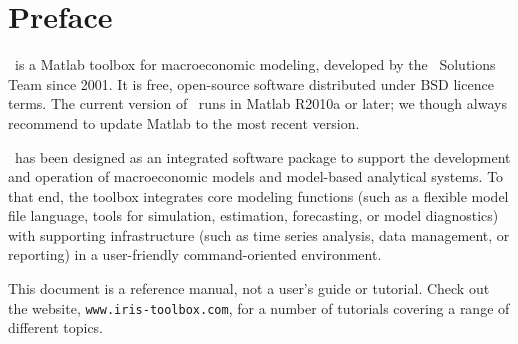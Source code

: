 
\section *{Preface}

\iris\ is a Matlab\raisebox{0.3em}{\tiny\textregistered} toolbox for macroeconomic modeling, developed by the \iris\ Solutions Team since 2001. It is free, open-source software distributed under BSD licence terms. The current version of \iris\ runs in Matlab R2010a or later; we though always recommend to update Matlab to the most recent version.

\iris\ has been designed as an integrated software package to support the development and operation of macroeconomic models and model-based analytical systems. To that end, the toolbox integrates core modeling functions (such as a flexible model file language, tools for simulation, estimation, forecasting, or model diagnostics) with supporting infrastructure (such as time series analysis, data management, or reporting) in a user-friendly command-oriented environment.

This document is a reference manual, not a user's guide or tutorial. Check out the website, \texttt{www.iris-toolbox.com}, for a number of tutorials covering a range of different topics.

